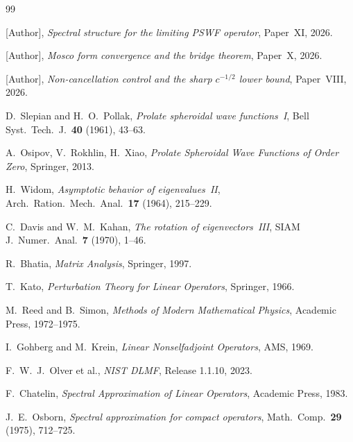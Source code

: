 \documentclass[12pt,a4paper]{amsart}
\theoremstyle{definition}
\theoremstyle{remark}
\begin{document}
\begin{thebibliography}{99}

[Author],
\textit{Spectral structure for the
limiting PSWF operator},
Paper~XI, 2026.

[Author],
\textit{Mosco form convergence
and the bridge theorem},
Paper~X, 2026.

[Author],
\textit{Non-cancellation control
and the sharp $c^{-1/2}$ lower bound},
Paper~VIII, 2026.

D.~Slepian and H.~O.~Pollak,
\textit{Prolate spheroidal wave
functions~I},
Bell Syst.\ Tech.\ J.\ \textbf{40}
(1961), 43--63.

A.~Osipov, V.~Rokhlin, H.~Xiao,
\textit{Prolate Spheroidal Wave
Functions of Order Zero},
Springer, 2013.

H.~Widom,
\textit{Asymptotic behavior of
eigenvalues~II},
Arch.\ Ration.\ Mech.\ Anal.\
\textbf{17} (1964), 215--229.

C.~Davis and W.~M.~Kahan,
\textit{The rotation of
eigenvectors~III},
SIAM J.\ Numer.\ Anal.\ \textbf{7}
(1970), 1--46.

R.~Bhatia,
\textit{Matrix Analysis},
Springer, 1997.

T.~Kato,
\textit{Perturbation Theory for
Linear Operators},
Springer, 1966.

M.~Reed and B.~Simon,
\textit{Methods of Modern
Mathematical Physics},
Academic Press, 1972--1975.

I.~Gohberg and M.~Krein,
\textit{Linear Nonselfadjoint
Operators}, AMS, 1969.

F.~W.~J.~Olver et al.,
\textit{NIST DLMF},
Release 1.1.10, 2023.

F.~Chatelin,
\textit{Spectral Approximation of
Linear Operators},
Academic Press, 1983.

J.~E.~Osborn,
\textit{Spectral approximation for
compact operators},
Math.\ Comp.\ \textbf{29}
(1975), 712--725.

\end{thebibliography}
\end{document}
